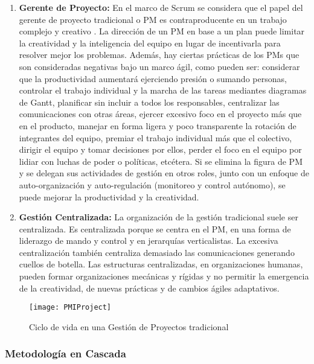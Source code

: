 \begin{enumerate}
\item \textbf{Gerente de Proyecto:} En el marco de Scrum se considera que el papel del gerente de proyecto tradicional o PM es contraproducente en un trabajo complejo y creativo \cite{Ken-Schwaber-2011}. La dirección de un PM en base a un plan puede limitar la creatividad y la inteligencia del equipo en lugar de incentivarla para resolver mejor los problemas. Además, hay ciertas prácticas de los PMs que son consideradas negativas bajo un marco ágil, como pueden ser: considerar que la productividad aumentará ejerciendo presión o sumando personas, controlar el trabajo individual y la marcha de las tareas mediantes diagramas de Gantt, planificar sin incluir a todos los responsables, centralizar las comunicaciones con otras áreas, ejercer excesivo foco en el proyecto más que en el producto, manejar en forma ligera y poco transparente la rotación de integrantes del equipo, premiar el trabajo individual más que el colectivo, dirigir el equipo y tomar decisiones por ellos, perder el foco en el equipo por lidiar con luchas de poder o políticas, etcétera. Si se elimina la figura de PM y se delegan sus actividades de gestión en otros roles, junto con un enfoque de auto-organización y auto-regulación (monitoreo y control autónomo), se puede mejorar la productividad y la creatividad.

\item \textbf{Gestión Centralizada:} La organización de la gestión tradicional suele ser centralizada. Es centralizada porque se centra en el PM, en una forma de liderazgo de mando y control y en jerarquías verticalistas. La excesiva centralización también centraliza demasiado las comunicaciones generando cuellos de botella. Las estructuras centralizadas, en organizaciones humanas, pueden formar organizaciones mecánicas y rígidas y no permitir la emergencia de la creatividad, de nuevas prácticas y de cambios ágiles adaptativos.

\end{enumerate}


\begin{figure}[h]
  \centering
  \texttt{[image: PMIProject]}
  \caption{Ciclo de vida en una Gestión de Proyectos tradicional}
  \centering
  \label{fig:PMIProject} %
\end{figure}


\subsubsection{Metodología en Cascada}


